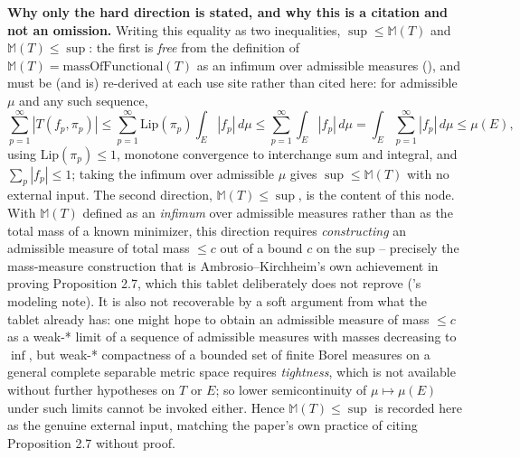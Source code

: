 \begin{definition}
  \textbf{Why only the hard direction is stated, and why this is a citation and not an omission.}
  Writing this equality as two inequalities, $\sup \le \mathbb{M}(T)$ and $\mathbb{M}(T) \le \sup$:
  the first is \emph{free} from the definition of $\mathbb{M}(T) = \mathrm{massOfFunctional}(T)$
  as an infimum over admissible measures (), and must be (and is)
  re-derived at each use site rather than cited here: for admissible $\mu$ and any such sequence,
  \[
    \sum_{p=1}^\infty |T(f_p,\pi_p)|
    \le \sum_{p=1}^\infty \mathrm{Lip}(\pi_p) \int_E |f_p| \, d\mu
    \le \sum_{p=1}^\infty \int_E |f_p| \, d\mu
    = \int_E \sum_{p=1}^\infty |f_p| \, d\mu
    \le \mu(E)
    ,
  \]
  using $\mathrm{Lip}(\pi_p) \le 1$, monotone convergence to interchange sum and integral, and
  $\sum_p |f_p| \le 1$; taking the infimum over admissible $\mu$ gives $\sup \le \mathbb{M}(T)$
  with no external input. The second direction, $\mathbb{M}(T) \le \sup$, is the content of this
  node. With $\mathbb{M}(T)$ defined as an \emph{infimum} over admissible measures rather than as
  the total mass of a known minimizer, this direction requires \emph{constructing} an admissible
  measure of total mass $\le c$ out of a bound $c$ on the sup -- precisely the mass-measure
  construction that is Ambrosio--Kirchheim's own achievement in proving Proposition 2.7, which this
  tablet deliberately does not reprove ('s modeling note). It is also not
  recoverable by a soft argument from what the tablet already has: one might hope to obtain an
  admissible measure of mass $\le c$ as a weak-* limit of a sequence of admissible measures with
  masses decreasing to $\inf$, but weak-* compactness of a bounded set of finite Borel measures on
  a general complete separable metric space requires \emph{tightness}, which is not available
  without further hypotheses on $T$ or $E$; so lower semicontinuity of $\mu \mapsto \mu(E)$ under
  such limits cannot be invoked either. Hence $\mathbb{M}(T) \le \sup$ is recorded here as the
  genuine external input, matching the paper's own practice of citing Proposition 2.7 without
  proof.


\end{definition}
